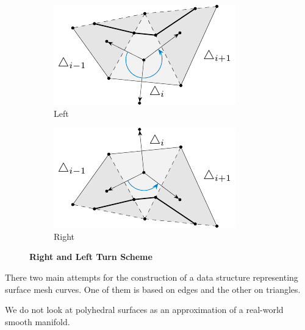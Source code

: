 \documentclass{stdlocal}
\begin{document}
  \begin{figure}
    \centering
    \begin{subfigure}[b]{0.45\linewidth}
      \centering
      \includegraphics[width=\linewidth]{figures/surface-mesh-curve-rot-left.pdf}
      \caption{Left}
    \end{subfigure}
    \hfill
    \begin{subfigure}[b]{0.45\linewidth}
      \centering
      \includegraphics[width=\linewidth]{figures/surface-mesh-curve-rot-right.pdf}
      \caption{Right}
    \end{subfigure}
    \caption[Right and Left Turn Scheme]{
      \textbf{Right and Left Turn Scheme}\\
    }
  \end{figure}

  There two main attempts for the construction of a data structure representing surface mesh curves.
  One of them is based on edges and the other on triangles.

  We do not look at polyhedral surfaces as an approximation of a real-world smooth manifold.
\end{document}
